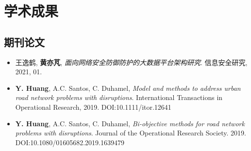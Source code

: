 \documentclass[letterpaper]{twentysecondcv} %
\begin{document}
\vspace{-0.2cm}
\section{学术成果}

\vspace{-0.2cm}
\subsection{期刊论文}
\begin{itemize}
    \item 王逸鹤, \textbf{黄亦芃}, \textit{面向网络安全防御防护的大数据平台架构研究}. 信息安全研究, 2021, 01.
    \item \textbf{Y. Huang}, A.C. Santos, C. Duhamel, \textit{Model and methods to address urban road network problems with disruptions}. International Transactions in Operational Research, 2019. DOI:10.1111/itor.12641
    \item \textbf{Y. Huang}, A.C. Santos, C. Duhamel, \textit{Bi-objective methods for road network problems with disruptions}. Journal of the Operational Research Society. 2019. DOI:10.1080/01605682.2019.1639479
\end{itemize}

\vspace{-0.1cm}
\end{document}
